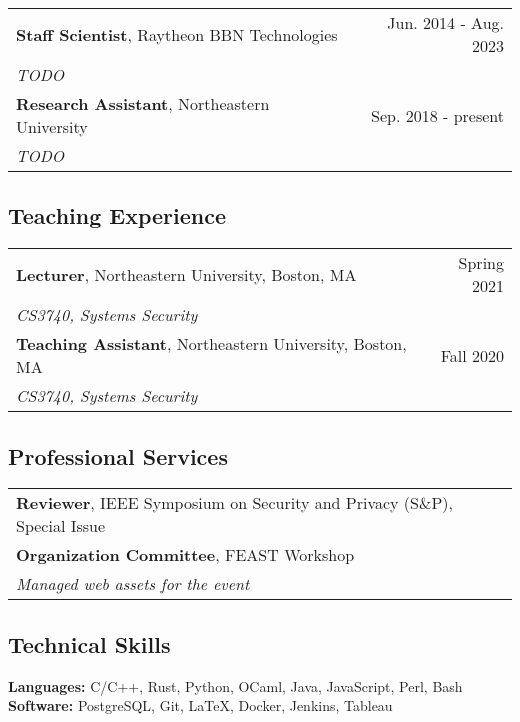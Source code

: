 \documentclass[11pt]{article}
\begin{document}
\begin{tabularx}{\textwidth}{>{\raggedright\arraybackslash}p{8cm}>{\raggedright\arraybackslash}r}
    \textbf{Staff Scientist}, Raytheon BBN Technologies & Jun. 2014 - Aug. 2023 \\
    \textit{TODO} & \\
    \textbf{Research Assistant}, Northeastern University & Sep. 2018 - present \\
    \textit{TODO} & \\
\end{tabularx}

\subsection{Teaching Experience}
\label{sec:teaching-experience}

\begin{tabularx}{\textwidth}{>{\raggedright\arraybackslash}p{8cm}>{\raggedright\arraybackslash}r}
    \textbf{Lecturer}, Northeastern University, Boston, MA & Spring 2021 \\
    \textit{CS3740, Systems Security} & \\
    \textbf{Teaching Assistant}, Northeastern University, Boston, MA & Fall 2020 \\
    \textit{CS3740, Systems Security} & \\
\end{tabularx}

\subsection{Professional Services}
\label{sec:services}

\begin{tabularx}{\textwidth}{>{\raggedright\arraybackslash}p{8cm}>{\raggedright\arraybackslash}r}
    \textbf{Reviewer}, IEEE Symposium on Security and Privacy (S\&P), Special Issue & 2022 \\
    \textbf{Organization Committee}, FEAST Workshop & 2020 \\
    \textit{Managed web assets for the event} & \\
\end{tabularx}

\subsection{Technical Skills}
\label{sec:skills}

\textbf{Languages:} C/C++, Rust, Python, OCaml, Java, JavaScript, Perl, Bash \\

\textbf{Software:} PostgreSQL, Git, LaTeX, Docker, Jenkins, Tableau \\
\end{document}
